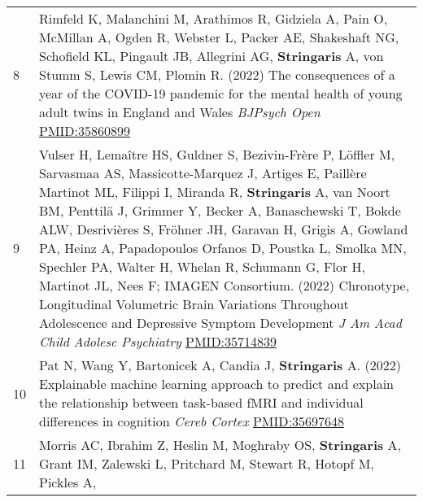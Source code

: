 \documentclass[
]{article}
\begin{document}
\begin{longtable}[]{@{}ll@{}}
\begin{minipage}[t]{0.01\columnwidth}\raggedright
8\strut
\end{minipage} & \begin{minipage}[t]{0.94\columnwidth}\raggedright
Rimfeld K, Malanchini M, Arathimos R, Gidziela A, Pain O, McMillan A,
Ogden R, Webster L, Packer AE, Shakeshaft NG, Schofield KL, Pingault JB,
Allegrini AG, \textbf{Stringaris} A, von Stumm S, Lewis CM, Plomin R.
(2022) The consequences of a year of the COVID-19 pandemic for the
mental health of young adult twins in England and Wales \emph{BJPsych
Open} \url{PMID:35860899}\strut
\end{minipage}\tabularnewline
\begin{minipage}[t]{0.01\columnwidth}\raggedright
9\strut
\end{minipage} & \begin{minipage}[t]{0.94\columnwidth}\raggedright
Vulser H, Lemaître HS, Guldner S, Bezivin-Frère P, Löffler M, Sarvasmaa
AS, Massicotte-Marquez J, Artiges E, Paillère Martinot ML, Filippi I,
Miranda R, \textbf{Stringaris} A, van Noort BM, Penttilä J, Grimmer Y,
Becker A, Banaschewski T, Bokde ALW, Desrivières S, Fröhner JH, Garavan
H, Grigis A, Gowland PA, Heinz A, Papadopoulos Orfanos D, Poustka L,
Smolka MN, Spechler PA, Walter H, Whelan R, Schumann G, Flor H, Martinot
JL, Nees F; IMAGEN Consortium. (2022) Chronotype, Longitudinal
Volumetric Brain Variations Throughout Adolescence and Depressive
Symptom Development \emph{J Am Acad Child Adolesc Psychiatry}
\url{PMID:35714839}\strut
\end{minipage}\tabularnewline
\begin{minipage}[t]{0.01\columnwidth}\raggedright
10\strut
\end{minipage} & \begin{minipage}[t]{0.94\columnwidth}\raggedright
Pat N, Wang Y, Bartonicek A, Candia J, \textbf{Stringaris} A. (2022)
Explainable machine learning approach to predict and explain the
relationship between task-based fMRI and individual differences in
cognition \emph{Cereb Cortex} \url{PMID:35697648}\strut
\end{minipage}\tabularnewline
\begin{minipage}[t]{0.01\columnwidth}\raggedright
11\strut
\end{minipage} & \begin{minipage}[t]{0.94\columnwidth}\raggedright
Morris AC, Ibrahim Z, Heslin M, Moghraby OS, \textbf{Stringaris} A,
Grant IM, Zalewski L, Pritchard M, Stewart R, Hotopf M, Pickles A,

\end{minipage}
\end{longtable}
\end{document}
